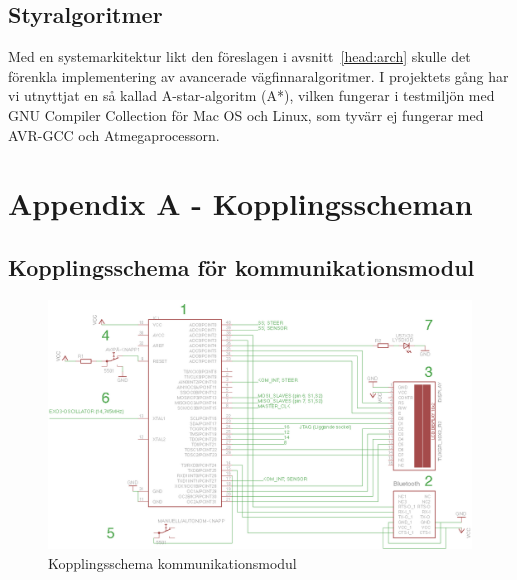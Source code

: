 \documentclass[a4paper,12pt,fleqn]{article}
\begin{document}
\subsection{Styralgoritmer}

Med en systemarkitektur likt den föreslagen i avsnitt~\ref{head:arch} skulle det förenkla implementering av avancerade vägfinnaralgoritmer. I projektets gång har vi utnyttjat en så kallad A-star-algoritm (A*), vilken fungerar i testmiljön med GNU Compiler Collection för Mac OS och Linux, som tyvärr ej fungerar med AVR-GCC och Atmegaprocessorn. 



\newpage
{}

\listoffootnotes


\newpage
\appendix
\pagestyle{empty}
\section*{Appendix A - Kopplingsscheman}
\subsection*{Kopplingsschema för kommunikationsmodul}

\begin{figure}[ht] %
  \begin{center}
  \includegraphics[keepaspectratio=true,width=\linewidth]{bilder/Kom_uptodate.png}  %
  \end{center}
  \caption{Kopplingsschema kommunikationsmodul} %
  \label{fig:kopplingkom} %
\end{figure}
 \clearpage %
 
\end{document}
